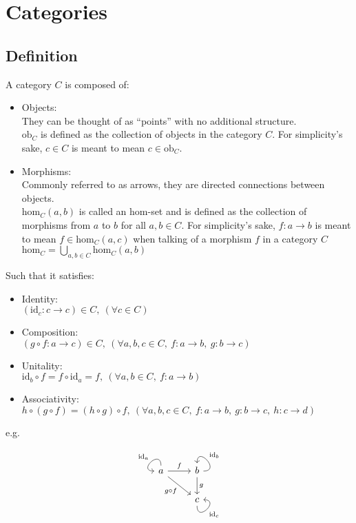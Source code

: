 \section{Categories}

\subsection{Definition}
A category $C$ is composed of: \parencite{fong:7sketches}
\begin{itemize}
  \item Objects:\\
    They can be thought of as ``points'' with no additional structure.\\
    $\mathrm{ob}_C$ is defined as the collection of objects in the category $C$.
    For simplicity's sake, $c\in C$ is meant to mean $c\in \mathrm{ob}_C$.
  \item Morphisms:\\
    Commonly referred to as arrows, they are directed connections between
    objects.\\
    $\mathrm{hom}_C(a, b)$ is called an hom-set and is defined as the collection
    of morphisms from $a$ to $b$ for all $a,b\in C$. For simplicity's sake, $f:
    a \to b$ is meant to mean $f \in \mathrm{hom}_C(a,c)$ when talking of a
    morphism $f$ in a category $C$\\
    $\mathrm{hom}_C = \bigcup\limits_{a,b\in C} \mathrm{hom}_C(a,b)$
\end{itemize}

Such that it satisfies:
\begin{itemize}
  \item Identity:\\
    $(\mathrm{id}_c: c \to c) \in C,\ (\forall c \in C)$
  \item Composition:\\
    $(g \circ f : a \to c) \in C,
      \ (\forall a, b, c \in C,\ f: a \to b,\ g:b \to c)$
  \item Unitality:\\
    $\mathrm{id}_b \circ f = f \circ \mathrm{id}_a = f,
      \ (\forall a, b \in C,\ f: a \to b)$
  \item Associativity:\\
    $h \circ (g \circ f) = (h \circ g) \circ f,
      \ (\forall a,b,c\in C,\ f:a\to b,\ g:b\to c,\ h:c\to d)$
\end{itemize}

e.g.
\[
  \begin{tikzcd}
    a
    \arrow[out=90, in=180, loop, swap, "\mathrm{id}_a", looseness=5]
    \arrow[r, "f"]
    \arrow[dr, swap, "g \circ f"]
    & b
    \arrow[out=0, in=90, loop, swap, "\mathrm{id}_b", looseness=4.5]
    \arrow[d,"g"]\\
    & c
    \arrow[out=-90, in=0, swap, "\mathrm{id}_c", looseness=5]
  \end{tikzcd}
\]

